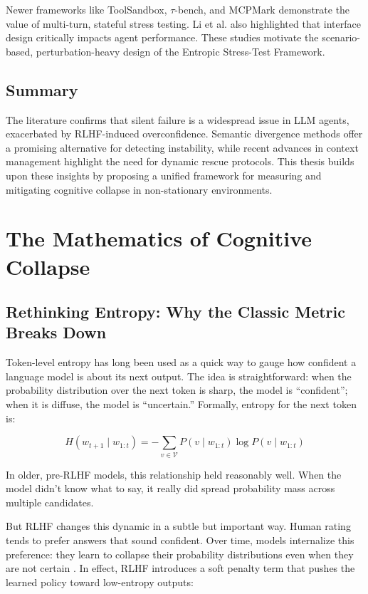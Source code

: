 \documentclass[12pt,a4paper]{report}
\begin{document}
Newer frameworks like ToolSandbox, $\tau$-bench, and MCPMark demonstrate the value of multi-turn, stateful stress testing. Li et al. \cite{Li2024SWEAgent} also highlighted that interface design critically impacts agent performance. These studies motivate the scenario-based, perturbation-heavy design of the Entropic Stress-Test Framework.

\section{Summary}
The literature confirms that silent failure is a widespread issue in LLM agents, exacerbated by RLHF-induced overconfidence. Semantic divergence methods offer a promising alternative for detecting instability, while recent advances in context management highlight the need for dynamic rescue protocols. This thesis builds upon these insights by proposing a unified framework for measuring and mitigating cognitive collapse in non-stationary environments.

\chapter{The Mathematics of Cognitive Collapse}

\section{Rethinking Entropy: Why the Classic Metric Breaks Down}
Token-level entropy has long been used as a quick way to gauge how confident a language model is about its next output. The idea is straightforward: when the probability distribution over the next token is sharp, the model is “confident”; when it is diffuse, the model is “uncertain.” Formally, entropy for the next token is:

\begin{equation}
H(w_{t+1} \mid w_{1:t}) = -\sum_{v \in \mathcal{V}} P(v \mid w_{1:t}) \log P(v \mid w_{1:t})
\end{equation}

In older, pre-RLHF models, this relationship held reasonably well. When the model didn’t know what to say, it really did spread probability mass across multiple candidates.

But RLHF changes this dynamic in a subtle but important way. Human rating tends to prefer answers that sound confident. Over time, models internalize this preference: they learn to collapse their probability distributions even when they are not certain \cite{Chen2025Overconfidence, Perez2024Mislead, Wang2024StyleOutweighs}. In effect, RLHF introduces a soft penalty term that pushes the learned policy toward low-entropy outputs:
\end{document}
